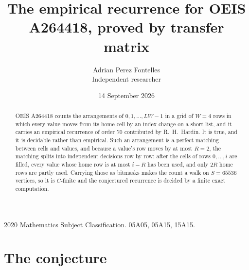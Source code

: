 \documentclass[11pt,a4paper]{article}
\title{The empirical recurrence for OEIS A264418, proved by transfer matrix}
\author{Adrian Perez Fontelles\\ \small Independent researcher}
\date{14 September 2026}
\theoremstyle{plain}
\theoremstyle{definition}
\begin{document}
\maketitle

\begin{abstract}
OEIS A264418 counts the arrangements of $0,1,\dots,LW-1$ in a grid of $W=4$ rows in which
every value moves from its home cell by an index change on a short list, and it carries an
empirical recurrence of order $70$ contributed by R.~H.~Hardin. It is true, and it is
decidable rather than empirical. Such an arrangement is a perfect matching between cells and
values, and because a value's row moves by at most $R=2$, the matching splits into
independent decisions row by row: after the cells of rows $0,\dots,i$ are filled,
every value whose home row is at most $i-R$ has been used, and only $2R$ home rows are
partly used. Carrying those as bitmasks makes the count a walk on $S=65536$ vertices, so it is
$C$-finite and the conjectured recurrence is decided by a finite exact computation.
\end{abstract}

\noindent\small 2020 Mathematics Subject Classification. 05A05, 05A15, 15A15.\normalsize

\section{The conjecture}
\end{document}
